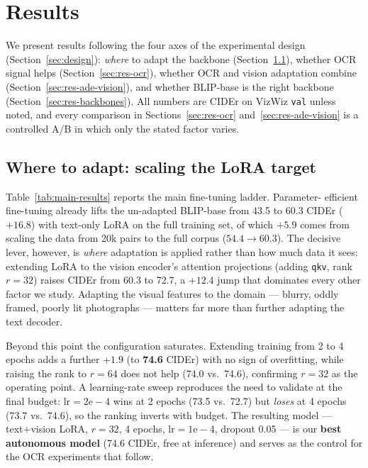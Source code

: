 
\section{Results}
\label{sec:results}

We present results following the four axes of the experimental design
(Section~\ref{sec:design}): \emph{where} to adapt the backbone
(Section~\ref{sec:res-scaling}), whether OCR signal helps
(Section~\ref{sec:res-ocr}), whether OCR and vision adaptation combine
(Section~\ref{sec:res-ade-vision}), and whether BLIP-base is the right backbone
(Section~\ref{sec:res-backbones}). All numbers are CIDEr on VizWiz
\texttt{val} unless noted, and every comparison in Sections~\ref{sec:res-ocr}
and~\ref{sec:res-ade-vision} is a controlled A/B in which only the stated factor
varies.

\subsection{Where to adapt: scaling the LoRA target}
\label{sec:res-scaling}

Table~\ref{tab:main-results} reports the main fine-tuning ladder. Parameter-%
efficient fine-tuning already lifts the un-adapted BLIP-base from
43.5 to 60.3 CIDEr ($+16.8$) with text-only LoRA on the full training set, of
which $+5.9$ comes from scaling the data from 20k pairs to the full corpus
($54.4\!\to\!60.3$). The decisive lever, however, is \emph{where} adaptation is
applied rather than how much data it sees: extending LoRA to the vision
encoder's attention projections (adding \texttt{qkv}, rank $r{=}32$) raises CIDEr
from 60.3 to 72.7, a $+12.4$ jump that dominates every other factor we study.
Adapting the visual features to the domain --- blurry, oddly framed, poorly lit
photographs --- matters far more than further adapting the text decoder.

Beyond this point the configuration saturates. Extending training from 2 to 4
epochs adds a further $+1.9$ (to \textbf{74.6} CIDEr) with no sign of
overfitting, while raising the rank to $r{=}64$ does not help (74.0 vs.\ 74.6),
confirming $r{=}32$ as the operating point. A learning-rate sweep reproduces the
need to validate at the final budget: $\text{lr}{=}2\mathrm{e}{-}4$ wins at 2
epochs (73.5 vs.\ 72.7) but \emph{loses} at 4 epochs (73.7 vs.\ 74.6), so the
ranking inverts with budget. The resulting model --- text+vision LoRA,
$r{=}32$, 4 epochs, $\text{lr}{=}1\mathrm{e}{-}4$, dropout 0.05 --- is our
\textbf{best autonomous model} (74.6 CIDEr, free at inference) and serves as the
control for the OCR experiments that follow.

